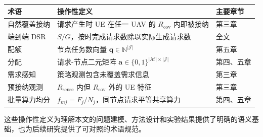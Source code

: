\begin{table}[htbp]
    \centering
    \label{tab:ch2-terminology}
    \small
    \begin{tabularx}{\textwidth}{p{}Yp{0.12\textwidth}}
        \toprule
        术语 & 操作性定义 & 主要章节 \\
        \midrule
        自然覆盖接纳 & 请求产生时 UE 在任一 UAV 的 $R_{\mathrm{cov}}$ 内即被接纳 & 第三章 \\
        端到端 DSR & $S/G$，按时完成请求数除以实际生成请求数 & 全文 \\
        配额 & 节点任务数向量 $\mathbf{q} \in \mathbb{N}^{|\mathcal{J}|}$ & 第五章 \\
        分配 & 请求-节点二元矩阵 $\mathbf{a} \in \{0,1\}^{|\mathcal{M}| \times |\mathcal{J}|}$ & 第四、五章 \\
        需求感知 & 策略观测包含未覆盖需求信息 & 第三章 \\
        预接纳观测 & $R_{\mathrm{sense}}$ 内但 $R_{\mathrm{cov}}$ 外的 UE 特征 & 第三章 \\
        批量算力均分 & $f_{mj} = F_j / N_j$，同节点请求平等共享算力 & 第四、五章 \\
        \bottomrule
    \end{tabularx}
\end{table}

这些操作性定义为理解本文的问题建模、方法设计和实验结果提供了明确的语义基础，也为后续研究提供了可对照的术语规范。
